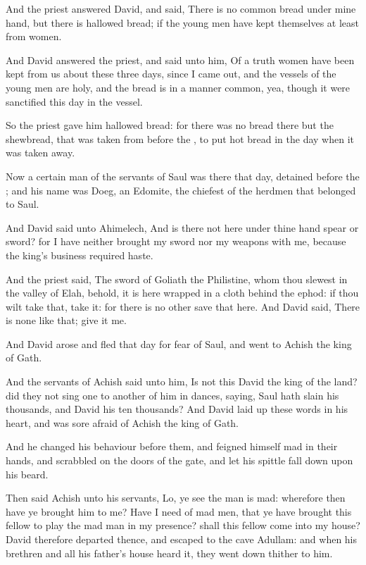 \Verse And the priest answered David, and said, There is no common bread under mine hand, but there is hallowed bread; if the young men have kept themselves at least from women.

\Verse And David answered the priest, and said unto him, Of a truth women have been kept from us about these three days, since I came out, and the vessels of the young men are holy, and the bread is in a manner common, yea, though it were sanctified this day in the vessel.

\Verse So the priest gave him hallowed bread: for there was no bread there but the shewbread, that was taken from before the \LORD, to put hot bread in the day when it was taken away.

\Verse Now a certain man of the servants of Saul was there that day, detained before the \LORD; and his name was Doeg, an Edomite, the chiefest of the herdmen that belonged to Saul.

\Verse And David said unto Ahimelech, And is there not here under thine hand spear or sword? for I have neither brought my sword nor my weapons with me, because the king's business required haste.

\Verse And the priest said, The sword of Goliath the Philistine, whom thou slewest in the valley of Elah, behold, it is here wrapped in a cloth behind the ephod: if thou wilt take that, take it: for there is no other save that here. And David said, There is none like that; give it me.

\Verse And David arose and fled that day for fear of Saul, and went to Achish the king of Gath.

\Verse And the servants of Achish said unto him, Is not this David the king of the land? did they not sing one to another of him in dances, saying, Saul hath slain his thousands, and David his ten thousands?  \Verse And David laid up these words in his heart, and was sore afraid of Achish the king of Gath.

\Verse And he changed his behaviour before them, and feigned himself mad in their hands, and scrabbled on the doors of the gate, and let his spittle fall down upon his beard.

\Verse Then said Achish unto his servants, Lo, ye see the man is mad: wherefore then have ye brought him to me?  \Verse Have I need of mad men, that ye have brought this fellow to play the mad man in my presence? shall this fellow come into my house?  
\Chapter
\Verse David therefore departed thence, and escaped to the cave Adullam: and when his brethren and all his father's house heard it, they went down thither to him.

